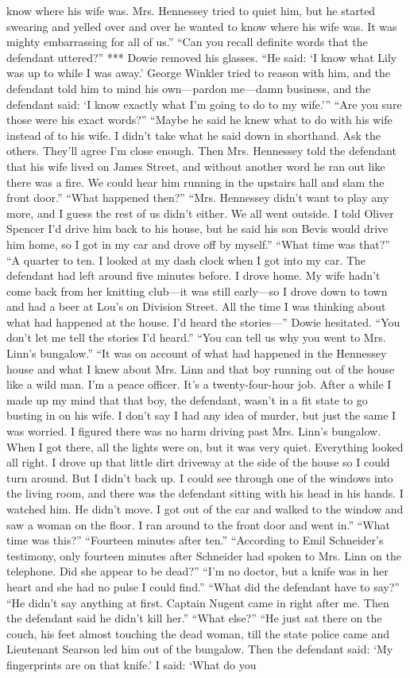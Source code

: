 \documentclass{novel}
\begin{document}
know where his wife was. Mrs. Hennessey tried to quiet him, but he started swearing and yelled over and over he wanted to know where his wife was. It was mighty embarrassing for all of us.” “Can you recall definite words that the defendant uttered?” *** Dowie removed his glasses. “He said: ‘I know what Lily was up to while I was away.’ George Winkler tried to reason with him, and the defendant told him to mind his own—pardon me—damn business, and the defendant said: ‘I know exactly what I’m going to do to my wife.’” “Are you sure those were his exact words?” “Maybe he said he knew what to do with his wife instead of to his wife. I didn’t take what he said down in shorthand. Ask the others. They’ll agree I’m close enough. Then Mrs. Hennessey told the defendant that his wife lived on James Street, and without another word he ran out like there was a fire. We could hear him running in the upstairs hall and slam the front door.” “What happened then?” “Mrs. Hennessey didn’t want to play any more, and I guess the rest of us didn’t either. We all went outside. I told Oliver Spencer I’d drive him back to his house, but he said his son Bevis would drive him home, so I got in my car and drove off by myself.” “What time was that?” “A quarter to ten. I looked at my dash clock when I got into my car. The defendant had left around five minutes before. I drove home. My wife hadn’t come back from her knitting club—it was still early—so I drove down to town and had a beer at Lou’s on Division Street. All the time I was thinking about what had happened at the house. I’d heard the stories—” Dowie hesitated. “You don’t let me tell the stories I’d heard.” “You can tell us why you went to Mrs. Linn’s bungalow.” “It was on account of what had happened in the Hennessey house and what I knew about Mrs. Linn and that boy running out of the house like a wild man. I’m a peace officer. It’s a twenty-four-hour job. After a while I made up my mind that that boy, the defendant, wasn’t in a fit state to go busting in on his wife. I don’t say I had any idea of murder, but just the same I was worried. I figured there was no harm driving past Mrs. Linn’s bungalow. When I got there, all the lights were on, but it was very quiet. Everything looked all right. I drove up that little dirt driveway at the side of the house so I could turn around. But I didn’t back up. I could see through one of the windows into the living room, and there was the defendant sitting with his head in his hands. I watched him. He didn’t move. I got out of the car and walked to the window and saw a woman on the floor. I ran around to the front door and went in.” “What time was this?” “Fourteen minutes after ten.” “According to Emil Schneider’s testimony, only fourteen minutes after Schneider had spoken to Mrs. Linn on the telephone. Did she appear to be dead?” “I’m no doctor, but a knife was in her heart and she had no pulse I could find.” “What did the defendant have to say?” “He didn’t say anything at first. Captain Nugent came in right after me. Then the defendant said he didn’t kill her.” “What else?” “He just sat there on the couch, his feet almost touching the dead woman, till the state police came and Lieutenant Searson led him out of the bungalow. Then the defendant said: ‘My fingerprints are on that knife.’ I said: ‘What do you 
\end{document}
